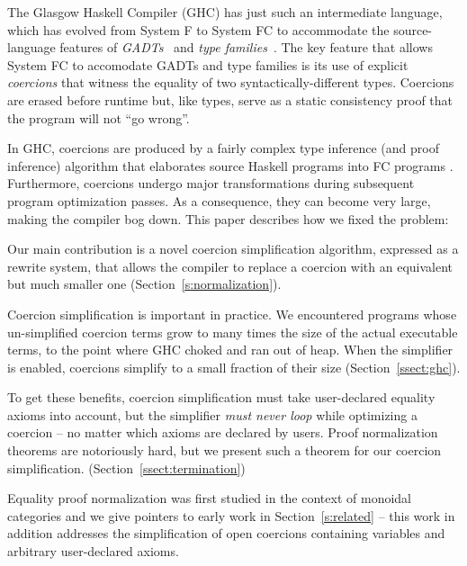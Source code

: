 \documentclass[a4paper,UKenglish]{lipics}
\begin{document}

The Glasgow Haskell Compiler (GHC) has just such an intermediate language,
which has evolved from System F to System FC
\cite{sulzmann+:fc-paper,weirich+:fc2} to accommodate the
source-language features of
\emph{GADTs}~\cite{cheney-hinze:phantom-types,sheard:omega,spj+:gadt}
and \emph{type families}~\cite{Kiselyov09funwith,chak+:synonyms}.
The key feature that allows System FC to accomodate GADTs and type
families is its use of explicit \emph{coercions} that witness the
equality of two syntactically-different types.  Coercions are erased
before runtime but, like types, serve as a static consistency
proof that the program will not ``go wrong''. 

In GHC, coercions are produced by a fairly complex
type inference (and proof inference) algorithm
that elaborates source Haskell programs into FC programs \cite{pjv:modular}. 
Furthermore, coercions undergo major transformations during subsequent program 
optimization passes. As a consequence, they can become very large, 
making the compiler bog down.  This paper describes how we fixed the problem:
\begin{itemize*} 
\item Our main contribution is a novel coercion simplification algorithm, expressed
as a rewrite system, that allows the compiler to replace a coercion
with an equivalent but much smaller one
(Section~\ref{s:normalization}).
     \item Coercion simplification is important in practice.
      We encountered programs whose un-simplified 
      coercion terms grow to many times the size of the actual executable terms, 
      to the point where GHC choked and ran out of heap. When the simplifier
      is enabled, coercions simplify to a small fraction of their
      size (Section~\ref{ssect:ghc}).
     \item To get these benefits, coercion simplification must take user-declared equality axioms 
      into account, but the simplifier {\em must never loop} while optimizing a coercion -- no matter 
      which axioms are declared by users. Proof normalization theorems are notoriously hard, 
      but we present such a theorem for our coercion simplification. (Section~\ref{ssect:termination})
   \end{itemize*}
Equality proof normalization was first studied in the context of monoidal categories and we give 
pointers to early work in Section~\ref{s:related} -- this work in addition addresses the simplification 
of open coercions containing variables and arbitrary user-declared axioms.
\end{document}
